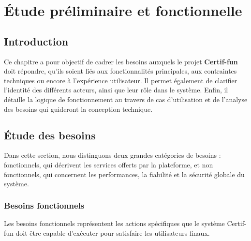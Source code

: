 \chapter{Étude préliminaire et fonctionnelle}

\section{Introduction}
Ce chapitre a pour objectif de cadrer les besoins auxquels le projet \textbf{Certif-fun} doit répondre, qu’ils soient liés aux fonctionnalités principales, aux contraintes techniques ou encore à l’expérience utilisateur. Il permet également de clarifier l’identité des différents acteurs, ainsi que leur rôle dans le système. Enfin, il détaille la logique de fonctionnement au travers de cas d’utilisation et de l’analyse des besoins qui guideront la conception technique.

\section{Étude des besoins}
Dans cette section, nous distinguons deux grandes catégories de besoins : fonctionnels, qui décrivent les services offerts par la plateforme, et non fonctionnels, qui concernent les performances, la fiabilité et la sécurité globale du système.

\subsection{Besoins fonctionnels}
Les besoins fonctionnels représentent les actions spécifiques que le système Certif-fun doit être capable d'exécuter pour satisfaire les utilisateurs finaux.

